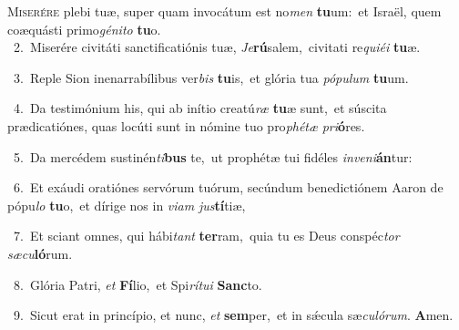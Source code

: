 \lettrine{\initial\textcolor{\initialcolor}{M}}{iserére} plebi tuæ, super quam invocátum est no\textit{men} \textbf{tu}\-um:~\star et Israël, quem coæquásti primo\-\textit{gé}\-\textit{ni}\textit{to} \textbf{tu}\-o.\\
{\numbfont\textcolor{\numbcolor}{~2.}}~Miserére civitáti sanctificatiónis tuæ, \textit{Je}\-\textbf{rú}salem,~\star civitati re\-\textit{qui}\-\textit{é}\textit{i} \textbf{tu}\-æ.\par
{\numbfont\textcolor{\numbcolor}{~3.}}~Reple Sion inenarrabílibus ver\textit{bis} \textbf{tu}\-is,~\star et glória tua \textit{pó}\-\textit{pu}\textit{lum} \textbf{tu}\-um.\par
{\numbfont\textcolor{\numbcolor}{~4.}}~Da testimónium his, qui ab inítio creatú\textit{ræ} \textbf{tu}\-æ sunt,~\star et súscita prædicatiónes, quas locúti sunt in nómine tuo pro\-\textit{phé}\-\textit{tæ} \textit{pri}\-\textbf{ó}res.\par
{\numbfont\textcolor{\numbcolor}{~5.}}~Da mercédem sustinén\-\textit{ti}\-\textbf{bus} te,~\star ut prophétæ tui fidéles \textit{in}\-\textit{ve}\textit{ni}\textbf{án}tur:\par
{\numbfont\textcolor{\numbcolor}{~6.}}~Et exáudi oratiónes servórum tuórum, secúndum benedictiónem Aaron de pópu\textit{lo} \textbf{tu}\-o,~\star et dírige nos in \textit{vi}\-\textit{am} \textit{jus}\-\textbf{tí}tiæ,\par
{\numbfont\textcolor{\numbcolor}{~7.}}~Et sciant omnes, qui hábi\textit{tant} \textbf{ter}\-ram,~\star quia tu es Deus conspéc\textit{tor} \textit{sæ}\-\textit{cu}\textbf{ló}rum.\par
{\numbfont\textcolor{\numbcolor}{~8.}}~Glória Patri, \textit{et} \textbf{Fí}\-lio,~\star et Spi\-\textit{rí}\-\textit{tu}\textit{i} \textbf{Sanc}\-to.\par
{\numbfont\textcolor{\numbcolor}{~9.}}~Sicut erat in princípio, et nunc, \textit{et} \textbf{sem}\-per,~\star et in sǽcula sæ\-\textit{cu}\-\textit{ló}\textit{rum}. \textbf{A}\-men.\par
